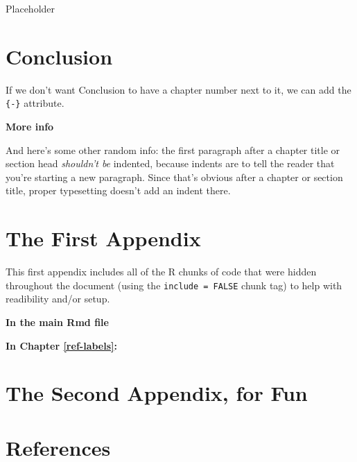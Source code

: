 \documentclass[12pt,twoside]{reedthesis}
\begin{document}
Placeholder

\hypertarget{conclusion-1}{%
\chapter*{Conclusion}\label{conclusion-1}}

If we don't want Conclusion to have a chapter number next to it, we can add the \texttt{\{-\}} attribute.

\textbf{More info}

And here's some other random info: the first paragraph after a chapter title or section head \emph{shouldn't be} indented, because indents are to tell the reader that you're starting a new paragraph. Since that's obvious after a chapter or section title, proper typesetting doesn't add an indent there.

\appendix

\hypertarget{the-first-appendix}{%
\chapter{The First Appendix}\label{the-first-appendix}}

This first appendix includes all of the R chunks of code that were hidden throughout the document (using the \texttt{include\ =\ FALSE} chunk tag) to help with readibility and/or setup.

\textbf{In the main Rmd file}

\textbf{In Chapter \ref{ref-labels}:}

\hypertarget{the-second-appendix-for-fun}{%
\chapter{The Second Appendix, for Fun}\label{the-second-appendix-for-fun}}

\hypertarget{references}{%
\chapter*{References}\label{references}}
\end{document}
